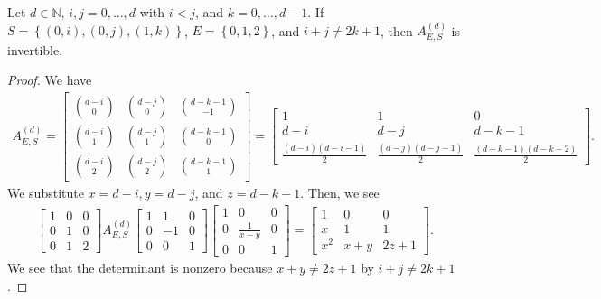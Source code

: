 \begin{proposition}\label{prop:impossible-support-2324223423123123}
    Let \( d \in \mathbb{N} \), \( i,j=0, \dots, d \) with \( i < j \), and \( k=0, \dots, d-1 \). If \( S = \left\{ (0,i), (0,j), (1,k) \right\} \), \( E = \left\{ 0,1,2 \right\} \), and \( i+j \neq 2k + 1 \), then \( A^{(d)}_{E,S} \) is invertible.
\end{proposition}

\begin{proof}
    We have 
    \begin{align*}
        A^{(d)}_{E,S} = \begin{bmatrix}
            \binom{d-i}{0} & \binom{d-j}{0} & \binom{d-k-1}{-1} \\
            \binom{d-i}{1} & \binom{d-j}{1} & \binom{d-k-1}{0} \\
            \binom{d-i}{2} & \binom{d-j}{2} & \binom{d-k-1}{1}
        \end{bmatrix} = \begin{bmatrix}
            1 & 1 & 0 \\
            d-i & d-j & d-k-1 \\
            \frac{(d-i)(d-i-1)}{2} & \frac{(d-j)(d-j-1)}{2} & \frac{(d-k-1)(d-k-2)}{2}
        \end{bmatrix}.
    \end{align*}
    We substitute \( x = d-i, y = d-j \), and \( z = d-k-1 \).
    Then, we see 
    \begin{align*}
        \begin{bmatrix}
            1 & 0 & 0 \\
            0 & 1 & 0 \\
            0 & 1 & 2
        \end{bmatrix}
        A^{(d)}_{E,S} \begin{bmatrix}
            1 & 1 & 0 \\
            0 & -1 & 0 \\
            0 & 0 & 1
        \end{bmatrix}
        \begin{bmatrix}
            1 & 0 & 0 \\
            0 & \frac{1}{x-y} & 0 \\
            0 & 0 & 1
        \end{bmatrix} = 
        \begin{bmatrix}
            1 & 0 & 0 \\
            x & 1 & 1 \\
            x^2 & x+y & 2z+1
        \end{bmatrix}.
    \end{align*}
    We see that the determinant is nonzero because \( x + y \neq 2z + 1 \) by \( i+j \neq 2k+1 \).
\end{proof}

